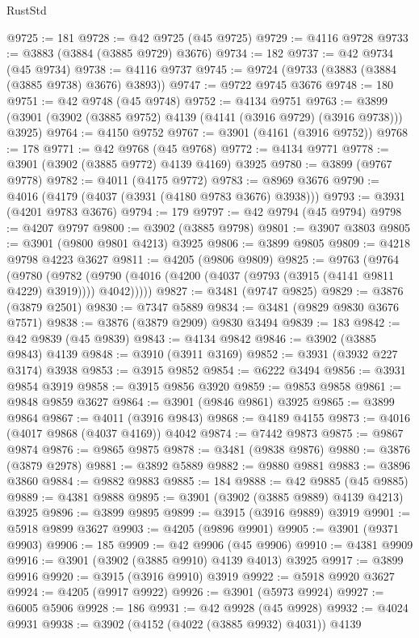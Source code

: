 \begin{lexlean}{RustStd}
\begin{coremodule}
@9725 := 181
@9728 := @42 @9725 (@45 @9725)
@9729 := @4116 @9728
@9733 := @3883 (@3884 (@3885 @9729) @3676)
@9734 := 182
@9737 := @42 @9734 (@45 @9734)
@9738 := @4116 @9737
@9745 := @9724 (@9733 (@3883 (@3884 (@3885 @9738) @3676) @3893))
@9747 := @9722 @9745 @3676
@9748 := 180
@9751 := @42 @9748 (@45 @9748)
@9752 := @4134 @9751
@9763 := @3899 (@3901 (@3902 (@3885 @9752) @4139 (@4141 (@3916 @9729) (@3916 @9738))) @3925)
@9764 := @4150 @9752
@9767 := @3901 (@4161 (@3916 @9752))
@9768 := 178
@9771 := @42 @9768 (@45 @9768)
@9772 := @4134 @9771
@9778 := @3901 (@3902 (@3885 @9772) @4139 @4169) @3925
@9780 := @3899 (@9767 @9778)
@9782 := @4011 (@4175 @9772)
@9783 := @8969 @3676
@9790 := @4016 (@4179 (@4037 (@3931 (@4180 @9783 @3676) @3938)))
@9793 := @3931 (@4201 @9783 @3676)
@9794 := 179
@9797 := @42 @9794 (@45 @9794)
@9798 := @4207 @9797
@9800 := @3902 (@3885 @9798)
@9801 := @3907 @3803
@9805 := @3901 (@9800 @9801 @4213) @3925
@9806 := @3899 @9805
@9809 := @4218 @9798 @4223 @3627
@9811 := @4205 (@9806 @9809)
@9825 := @9763
    (@9764
      (@9780
        (@9782 (@9790 (@4016 (@4200 (@4037 (@9793 (@3915 (@4141 @9811 @4229) @3919)))) @4042)))))
@9827 := @3481 (@9747 @9825)
@9829 := @3876 (@3879 @2501)
@9830 := @7347 @5889
@9834 := @3481 (@9829 @9830 @3676 @7571)
@9838 := @3876 (@3879 @2909) @9830 @3494
@9839 := 183
@9842 := @42 @9839 (@45 @9839)
@9843 := @4134 @9842
@9846 := @3902 (@3885 @9843) @4139
@9848 := @3910 (@3911 @3169)
@9852 := @3931 (@3932 @227 @3174) @3938
@9853 := @3915 @9852
@9854 := @6222 @3494
@9856 := @3931 @9854 @3919
@9858 := @3915 @9856 @3920
@9859 := @9853 @9858
@9861 := @9848 @9859 @3627
@9864 := @3901 (@9846 @9861) @3925
@9865 := @3899 @9864
@9867 := @4011 (@3916 @9843)
@9868 := @4189 @4155
@9873 := @4016 (@4017 @9868 (@4037 @4169)) @4042
@9874 := @7442 @9873
@9875 := @9867 @9874
@9876 := @9865 @9875
@9878 := @3481 (@9838 @9876)
@9880 := @3876 (@3879 @2978)
@9881 := @3892 @5889
@9882 := @9880 @9881
@9883 := @3896 @3860
@9884 := @9882 @9883
@9885 := 184
@9888 := @42 @9885 (@45 @9885)
@9889 := @4381 @9888
@9895 := @3901 (@3902 (@3885 @9889) @4139 @4213) @3925
@9896 := @3899 @9895
@9899 := @3915 (@3916 @9889) @3919
@9901 := @5918 @9899 @3627
@9903 := @4205 (@9896 @9901)
@9905 := @3901 (@9371 @9903)
@9906 := 185
@9909 := @42 @9906 (@45 @9906)
@9910 := @4381 @9909
@9916 := @3901 (@3902 (@3885 @9910) @4139 @4013) @3925
@9917 := @3899 @9916
@9920 := @3915 (@3916 @9910) @3919
@9922 := @5918 @9920 @3627
@9924 := @4205 (@9917 @9922)
@9926 := @3901 (@5973 @9924)
@9927 := @6005 @5906
@9928 := 186
@9931 := @42 @9928 (@45 @9928)
@9932 := @4024 @9931
@9938 := @3902 (@4152 (@4022 (@3885 @9932) @4031)) @4139

\end{coremodule}
\end{lexlean}
